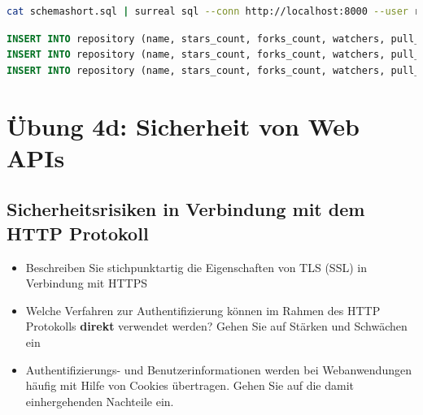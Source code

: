 \documentclass[notitlepage, hidelinks]{article}
\begin{document}
\begin{lstlisting}[language=bash,frame=single,caption=CLI Kommando zur Übertragung der Daten aus der Datei in Listing \ref{sqldbone},label=dbsetup]
cat schemashort.sql | surreal sql --conn http://localhost:8000 --user root --pass root --ns base --db base
\end{lstlisting}


\begin{lstlisting}[language=SQL,frame=single,caption=Ausschnitt der sql Setupdatei,label=sqldbone]
INSERT INTO repository (name, stars_count, forks_count, watchers, pull_requests, primary_language, languages_used, commit_count, created_at, licence) VALUES ('react', 159266, 30464, 8497, 2911, lang:JavaScript, [lang:JavaScript, lang:HTML, lang:CSS], 5562, '2013-05-24T16:15:54Z', 'MIT License');
INSERT INTO repository (name, stars_count, forks_count, watchers, pull_requests, primary_language, languages_used, commit_count, created_at, licence) VALUES ('scikit-learn', 38327, 18225, 4968, 1701, lang:Python, [lang:Python, lang:Cython, lang:HTML, lang:CSS], 4085, '2010-01-10T09:58:52Z', 'BSD-3-Clause License');
INSERT INTO repository (name, stars_count, forks_count, watchers, pull_requests, primary_language, languages_used, commit_count, created_at, licence) VALUES ('angular', 68521, 24536, 6779, 2197, lang:TypeScript, [lang:TypeScript, lang:JavaScript, lang:HTML, lang:CSS], 4248, '2014-09-18T16:12:01Z', 'MIT License');
\end{lstlisting}



\newpage
\section{Übung 4d: Sicherheit von Web APIs}
\subsection{Sicherheitsrisiken in Verbindung mit dem HTTP Protokoll}
\begin{itemize}
\item Beschreiben Sie stichpunktartig die Eigenschaften von TLS (SSL) in Verbindung mit HTTPS
\item Welche Verfahren zur Authentifizierung können im Rahmen des HTTP Protokolls \textbf{direkt} verwendet werden? Gehen Sie auf Stärken und Schwächen ein
\item Authentifizierungs- und Benutzerinformationen werden bei Webanwendungen häufig mit Hilfe von Cookies übertragen. Gehen Sie auf die damit einhergehenden Nachteile ein. 
\end{itemize}
\end{document}
